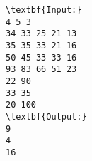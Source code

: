 \begin{verbatim}
\textbf{Input:}
4 5 3
34 33 25 21 13
35 35 33 21 16
50 45 33 33 16
93 83 66 51 23
22 90
33 35
20 100
\textbf{Output:}
9
4
16\end{verbatim}